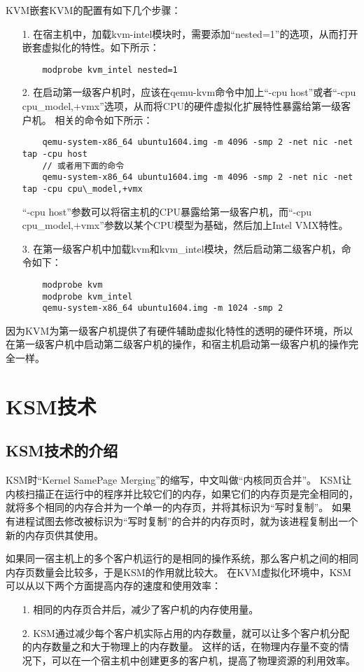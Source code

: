\documentclass[a4paper,left=2.5cm,right=2.5cm,11pt]{article}
\begin{document}
	KVM嵌套KVM的配置有如下几个步骤：
	\begin{itemize}
		\item[1.] 在宿主机中，加载kvm-intel模块时，需要添加“nested=1”的选项，从而打开嵌套虚拟化的特性。如下所示：
		\begin{lstlisting}
	modprobe kvm_intel nested=1
		\end{lstlisting}

		\item[2.] 在启动第一级客户机时，应该在qemu-kvm命令中加上“-cpu host”或者“-cpu cpu\_model,+vmx”选项，从而将CPU的硬件虚拟化扩展特性暴露给第一级客户机。
		相关的命令如下所示：
		\begin{lstlisting}
	qemu-system-x86_64 ubuntu1604.img -m 4096 -smp 2 -net nic -net tap -cpu host
	// 或者用下面的命令
	qemu-system-x86_64 ubuntu1604.img -m 4096 -smp 2 -net nic -net tap -cpu cpu\_model,+vmx
		\end{lstlisting}

		“-cpu host”参数可以将宿主机的CPU暴露给第一级客户机，而“-cpu cpu\_model,+vmx”参数以某个CPU模型为基础，然后加上Intel VMX特性。

		\item[3.] 在第一级客户机中加载kvm和kvm\_intel模块，然后启动第二级客户机，命令如下：
		\begin{lstlisting}
	modprobe kvm
	modprobe kvm_intel
	qemu-system-x86_64 ubuntu1604.img -m 1024 -smp 2
		\end{lstlisting}
	\end{itemize}

	因为KVM为第一级客户机提供了有硬件辅助虚拟化特性的透明的硬件环境，所以在第一级客户机中启动第二级客户机的操作，和宿主机启动第一级客户机的操作完全一样。

\section{KSM技术}
\subsection{KSM技术的介绍}
	KSM时“Kernel SamePage Merging”的缩写，中文叫做“内核同页合并”。
	KSM让内核扫描正在运行中的程序并比较它们的内存，如果它们的内存页是完全相同的，就将多个相同的内存合并为一个单一的内存页，并将其标识为“写时复制”。
	如果有进程试图去修改被标识为“写时复制”的合并的内存页时，就为该进程复制出一个新的内存页供其使用。\par
	如果同一宿主机上的多个客户机运行的是相同的操作系统，那么客户机之间的相同内存页数量会比较多，于是KSM的作用就比较大。
	在KVM虚拟化环境中，KSM可以从以下两个方面提高内存的速度和使用效率：
	\begin{itemize}
		\item[1.] 相同的内存页合并后，减少了客户机的内存使用量。
		\item[2.] KSM通过减少每个客户机实际占用的内存数量，就可以让多个客户机分配的内存数量之和大于物理上的内存数量。
		这样的话，在物理内存量不变的情况下，可以在一个宿主机中创建更多的客户机，提高了物理资源的利用效率。
	\end{itemize}
\end{document}
